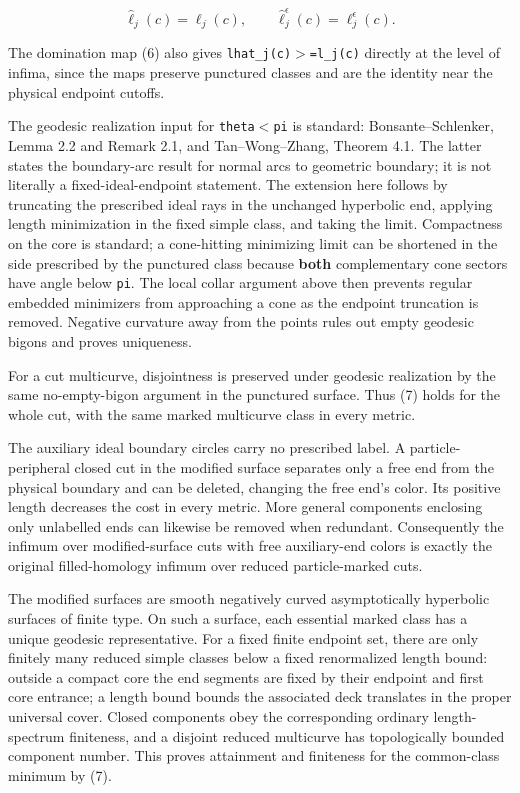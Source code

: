 \documentclass[11pt]{article}
\renewcommand{\textgreater}{\ensuremath{>}}
\renewcommand{\textless}{\ensuremath{<}}
\begin{document}
\[
\widehat\ell_j(c)=\ell_j(c),
\qquad
\widehat\ell_j^\epsilon(c)=\ell_j^\epsilon(c).
\tag{7}
\]

The domination map (6) also gives
\texttt{lhat\_\allowbreak j(c)\textgreater{}=l\_\allowbreak j(c)} directly at the level of
infima, since the maps preserve punctured classes and are the identity
near the physical endpoint cutoffs.

The geodesic realization input for \texttt{theta\textless{}pi} is
standard: Bonsante--Schlenker, Lemma 2.2 and Remark 2.1, and
Tan--Wong--Zhang, Theorem 4.1. The latter states the boundary-arc result
for normal arcs to geometric boundary; it is not literally a
fixed-ideal-endpoint statement. The extension here follows by truncating
the prescribed ideal rays in the unchanged hyperbolic end, applying
length minimization in the fixed simple class, and taking the limit.
Compactness on the core is standard; a cone-hitting minimizing limit can
be shortened in the side prescribed by the punctured class because
\textbf{both} complementary cone sectors have angle below \texttt{pi}.
The local collar argument above then prevents regular embedded
minimizers from approaching a cone as the endpoint truncation is
removed. Negative curvature away from the points rules out empty
geodesic bigons and proves uniqueness.

For a cut multicurve, disjointness is preserved under geodesic
realization by the same no-empty-bigon argument in the punctured
surface. Thus (7) holds for the whole cut, with the same marked
multicurve class in every metric.

The auxiliary ideal boundary circles carry no prescribed label. A
particle-peripheral closed cut in the modified surface separates only a
free end from the physical boundary and can be deleted, changing the
free end's color. Its positive length decreases the cost in every
metric. More general components enclosing only unlabelled ends can
likewise be removed when redundant. Consequently the infimum over
modified-surface cuts with free auxiliary-end colors is exactly the
original filled-homology infimum over reduced particle-marked cuts.

The modified surfaces are smooth negatively curved asymptotically
hyperbolic surfaces of finite type. On such a surface, each essential
marked class has a unique geodesic representative. For a fixed finite
endpoint set, there are only finitely many reduced simple classes below
a fixed renormalized length bound: outside a compact core the end
segments are fixed by their endpoint and first core entrance; a length
bound bounds the associated deck translates in the proper universal
cover. Closed components obey the corresponding ordinary length-spectrum
finiteness, and a disjoint reduced multicurve has topologically bounded
component number. This proves attainment and finiteness for the
common-class minimum by (7).
\end{document}
